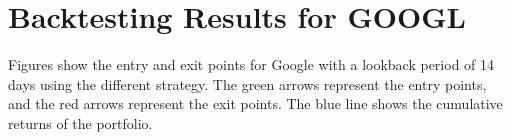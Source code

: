 

















\section{Backtesting Results for GOOGL}
Figures show the entry and exit points for Google with a lookback period of 14 days using the different strategy. The green arrows represent the entry points, and the red arrows represent the exit points. The blue line shows the cumulative returns of the portfolio.

